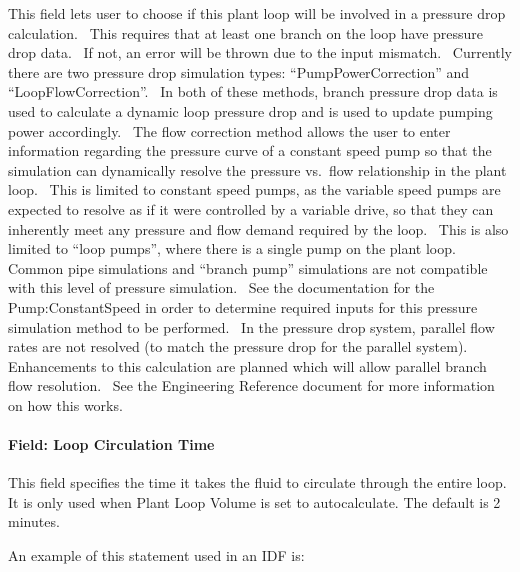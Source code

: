 This field lets user to choose if this plant loop will be involved in a pressure drop calculation.~ This requires that at least one branch on the loop have pressure drop data.~ If not, an error will be thrown due to the input mismatch.~ Currently there are two pressure drop simulation types: ``PumpPowerCorrection'' and ``LoopFlowCorrection''.~ In both of these methods, branch pressure drop data is used to calculate a dynamic loop pressure drop and is used to update pumping power accordingly.~ The flow correction method allows the user to enter information regarding the pressure curve of a constant speed pump so that the simulation can dynamically resolve the pressure vs.~flow relationship in the plant loop.~ This is limited to constant speed pumps, as the variable speed pumps are expected to resolve as if it were controlled by a variable drive, so that they can inherently meet any pressure and flow demand required by the loop.~ This is also limited to ``loop pumps'', where there is a single pump on the plant loop. Common pipe simulations and ``branch pump'' simulations are not compatible with this level of pressure simulation.~ See the documentation for the Pump:ConstantSpeed in order to determine required inputs for this pressure simulation method to be performed.~ In the pressure drop system, parallel flow rates are not resolved (to match the pressure drop for the parallel system).~ Enhancements to this calculation are planned which will allow parallel branch flow resolution.~ See the Engineering Reference document for more information on how this works.

\paragraph{Field: Loop Circulation Time}\label{field-pressure-simulation-type}

This field specifies the time it takes the fluid to circulate through the entire loop. It is only used when Plant Loop Volume is set to autocalculate. The default is 2 minutes. 

An example of this statement used in an IDF is:

